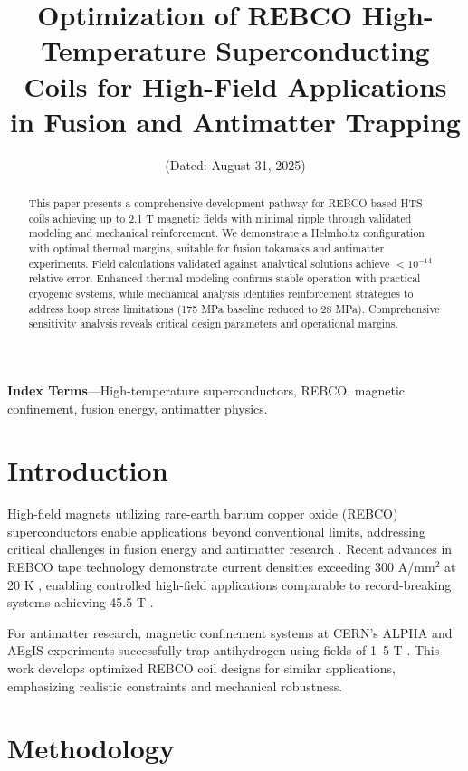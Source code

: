 \documentclass[10pt,twocolumn]{article}
\title{\Large\bfseries Optimization of REBCO High-Temperature Superconducting Coils for High-Field Applications in Fusion and Antimatter Trapping}
\author{\authorname}
\affil{Independent Researcher\thanks{Electronic address: \texttt{\authoremail}.}}
\date{(Dated: August 31, 2025)}
\begin{document}
\makeatletter
\renewcommand\@makefntext[1]{%
  \noindent\makebox[1.8em][l]{\@makefnmark}#1%
}
\makeatother

\maketitle

\begin{abstract}
This paper presents a comprehensive development pathway for REBCO-based HTS coils achieving up to 2.1 T magnetic fields with minimal ripple through validated modeling and mechanical reinforcement. We demonstrate a Helmholtz configuration with optimal thermal margins, suitable for fusion tokamaks and antimatter experiments. Field calculations validated against analytical solutions achieve $<10^{-14}$ relative error. Enhanced thermal modeling confirms stable operation with practical cryogenic systems, while mechanical analysis identifies reinforcement strategies to address hoop stress limitations (175 MPa baseline reduced to 28 MPa). Comprehensive sensitivity analysis reveals critical design parameters and operational margins.
\end{abstract}

\textbf{Index Terms}---High-temperature superconductors, REBCO, magnetic confinement, fusion energy, antimatter physics.

\section{Introduction}

High-field magnets utilizing rare-earth barium copper oxide (REBCO) superconductors enable applications beyond conventional limits, addressing critical challenges in fusion energy and antimatter research \cite{zhou2023}. Recent advances in REBCO tape technology demonstrate current densities exceeding 300 A/mm$^2$ at 20 K \cite{superpower2022}, enabling controlled high-field applications comparable to record-breaking systems achieving 45.5 T \cite{hahn2019}.

For antimatter research, magnetic confinement systems at CERN's ALPHA and AEgIS experiments successfully trap antihydrogen using fields of 1--5 T \cite{alpha2023,aegis2018}. This work develops optimized REBCO coil designs for similar applications, emphasizing realistic constraints and mechanical robustness.

\section{Methodology}
\end{document}
